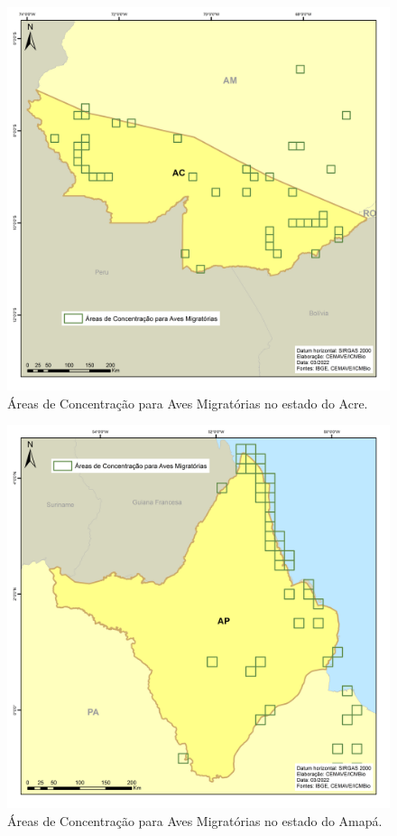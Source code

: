 \documentclass[
  oneside]{scrbook}
\begin{document}
\begin{figure}[H]

{\centering \includegraphics[width=0.75\linewidth]{imagens/cap07/Figura_7.20_AC} 

}

\caption{Áreas de Concentração para Aves Migratórias no estado do Acre.}\label{fig:40}
\end{figure}

\begin{figure}[H]

{\centering \includegraphics[width=0.75\linewidth]{imagens/cap07/Figura_7.21_AP} 

}

\caption{Áreas de Concentração para Aves Migratórias no estado do Amapá.}\label{fig:41}
\end{figure}
\end{document}
